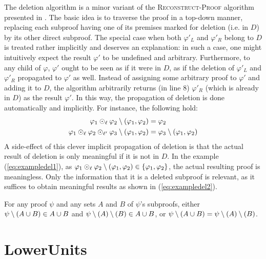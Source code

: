 \documentclass{llncs}
\begin{document}
The deletion algorithm is a minor variant of the \textsc{Reconstruct-Proof} algorithm presented in
\cite{RP11}.
The basic idea is to traverse the proof in a top-down manner, replacing
each subproof having one of its premises marked for deletion (i.e. in $D$) by its other direct
subproof. The special case when both $\varphi'_L$ and $\varphi'_R$ belong to $D$ is treated rather
implicitly and deserves an explanation: in such a case, one might intuitively expect the result
$\varphi'$ to be undefined and arbitrary. Furthermore, to any child of $\varphi$, $\varphi'$ ought
to be seen as if it were in $D$, as if the deletion of $\varphi'_L$ and $\varphi'_R$ propagated to
$\varphi'$ as well. Instead of assigning some arbitrary proof to $\varphi'$ and adding it to $D$,
the algorithm arbitrarily returns (in line 8) $\varphi'_R$ (which is already in $D$) as the result
$\varphi'$. In this way, the propagation of deletion is done automatically and implicitly. For
instance, the following hold:
\begin{align}
  \varphi_1 \odot_\ell \varphi_2 \setminus (\varphi_1, \varphi_2) &= \varphi_2 \label{eq:exampledel1} \\
\varphi_1 \odot_\ell \varphi_2 \odot_{\ell'} \varphi_3 \setminus (\varphi_1, \varphi_2) &=
  \varphi_3 \setminus (\varphi_1, \varphi_2) \label{eq:exampledel2}
\end{align}
A side-effect of this clever implicit propagation of deletion is that the actual result of deletion
is only meaningful if it is not in $D$. In the example (\ref{eq:exampledel1}), as $\varphi_1
\odot_\ell \varphi_2 \setminus (\varphi_1, \varphi_2) \in \{\varphi_1, \varphi_2\} $, the actual resulting
proof is meaningless. Only the information that it is a deleted subproof is relevant, as it suffices
to obtain meaningful results as shown in (\ref{eq:exampledel2}).

\begin{proposition} \label{prop:del_assoc}
For any proof $\psi$ and any sets $A$ and $B$ of $\psi$'s subproofs,
either $\psi \setminus (A \cup B)  \in A \cup B$
and    $\psi \setminus (A) \setminus (B) \in A \cup B$,
or     $\psi \setminus (A \cup B) = \psi \setminus (A) \setminus (B)$.
\end{proposition}




\newcommand{\pedge}[3]{\ensuremath{\raiz{#1} \xrightarrow{#2} \raiz{#3}}}




\section{LowerUnits} \label{sec:LU}
\end{document}
